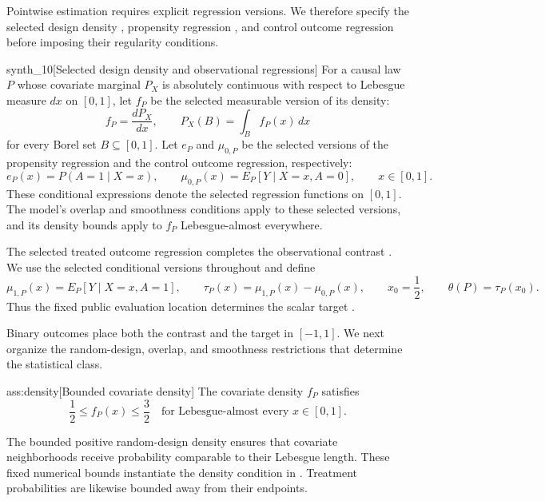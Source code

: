 \documentclass[11pt]{article}
\begin{document}
Pointwise estimation requires explicit regression versions. We therefore specify the selected design density , propensity regression , and control outcome regression  before imposing their regularity conditions.

\begin{definitionv}{synth_10}[Selected design density and observational regressions]
For a causal law \(P\) whose covariate marginal \(P_X\) is absolutely continuous with respect to Lebesgue measure \(dx\) on \([0,1]\), let \(f_P\) be the selected measurable version of its density:
\[
f_P=\frac{dP_X}{dx},
\qquad
P_X(B)=\int_B f_P(x)\,dx
\]
for every Borel set \(B\subseteq[0,1]\). Let \(e_P\) and \(\mu_{0,P}\) be the selected versions of the propensity regression and the control outcome regression, respectively:
\[
e_P(x)=P(A=1\mid X=x),
\qquad
\mu_{0,P}(x)=E_P[Y\mid X=x,A=0],
\qquad x\in[0,1].
\]
These conditional expressions denote the selected regression functions on \([0,1]\). The model's overlap and smoothness conditions apply to these selected versions, and its density bounds apply to \(f_P\) Lebesgue-almost everywhere.
\end{definitionv}

The selected treated outcome regression  completes the observational contrast . We use the selected conditional versions throughout and define
\[
\mu_{1,P}(x)=E_P[Y\mid X=x,A=1],
\qquad
\tau_P(x)=\mu_{1,P}(x)-\mu_{0,P}(x),
\qquad
x_0=\frac12,
\qquad
\theta(P)=\tau_P(x_0).
\]
Thus the fixed public evaluation location  determines the scalar target .



Binary outcomes place both the contrast and the target in \([-1,1]\). We next organize the random-design, overlap, and smoothness restrictions that determine the statistical class.

\begin{assumptionv}{ass:density}[Bounded covariate density]
The covariate density \(f_P\) satisfies
\[
\frac12\le f_P(x)\le\frac32
\quad\text{for Lebesgue-almost every }x\in[0,1].
\]
\end{assumptionv}

The bounded positive random-design density ensures that covariate neighborhoods receive probability comparable to their Lebesgue length. These fixed numerical bounds instantiate the density condition in \citep[Theorem 1, footnote 6]{WagerAthey2018}. Treatment probabilities are likewise bounded away from their endpoints.
\end{document}
